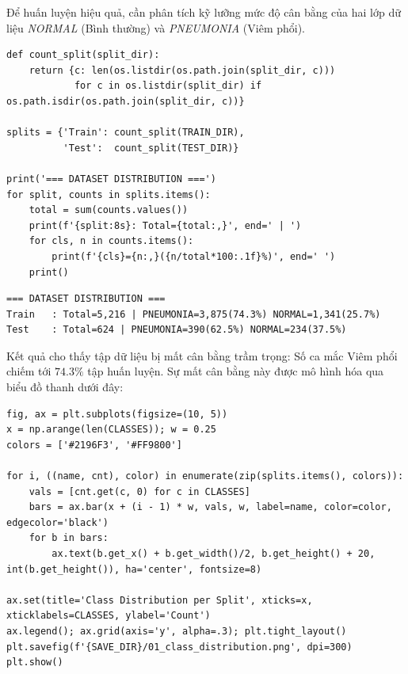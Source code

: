 Để huấn luyện hiệu quả, cần phân tích kỹ lưỡng mức độ cân bằng của hai lớp dữ liệu \textit{NORMAL} (Bình thường) và \textit{PNEUMONIA} (Viêm phổi).

\begin{lstlisting}[style=pythoncode, caption={Thống kê số lượng bệnh án theo từng lớp}]
def count_split(split_dir):
    return {c: len(os.listdir(os.path.join(split_dir, c)))
            for c in os.listdir(split_dir) if os.path.isdir(os.path.join(split_dir, c))}

splits = {'Train': count_split(TRAIN_DIR),
          'Test':  count_split(TEST_DIR)}

print('=== DATASET DISTRIBUTION ===')
for split, counts in splits.items():
    total = sum(counts.values())
    print(f'{split:8s}: Total={total:,}', end=' | ')
    for cls, n in counts.items():
        print(f'{cls}={n:,}({n/total*100:.1f}%)', end=' ')
    print()
\end{lstlisting}

\begin{lstlisting}[style=consoleoutput, caption={Output: Phân phối mẫu bệnh lý}]
=== DATASET DISTRIBUTION ===
Train   : Total=5,216 | PNEUMONIA=3,875(74.3%) NORMAL=1,341(25.7%) 
Test    : Total=624 | PNEUMONIA=390(62.5%) NORMAL=234(37.5%) 
\end{lstlisting}

Kết quả cho thấy tập dữ liệu bị mất cân bằng trầm trọng: Số ca mắc Viêm phổi chiếm tới $74.3\%$ tập huấn luyện. Sự mất cân bằng này được mô hình hóa qua biểu đồ thanh dưới đây:

\begin{lstlisting}[style=pythoncode, caption={Vẽ biểu đồ phân bố nhãn (Class Distribution)}]
fig, ax = plt.subplots(figsize=(10, 5))
x = np.arange(len(CLASSES)); w = 0.25
colors = ['#2196F3', '#FF9800']

for i, ((name, cnt), color) in enumerate(zip(splits.items(), colors)):
    vals = [cnt.get(c, 0) for c in CLASSES]
    bars = ax.bar(x + (i - 1) * w, vals, w, label=name, color=color, edgecolor='black')
    for b in bars:
        ax.text(b.get_x() + b.get_width()/2, b.get_height() + 20, int(b.get_height()), ha='center', fontsize=8)

ax.set(title='Class Distribution per Split', xticks=x, xticklabels=CLASSES, ylabel='Count')
ax.legend(); ax.grid(axis='y', alpha=.3); plt.tight_layout()
plt.savefig(f'{SAVE_DIR}/01_class_distribution.png', dpi=300)
plt.show()
\end{lstlisting}

